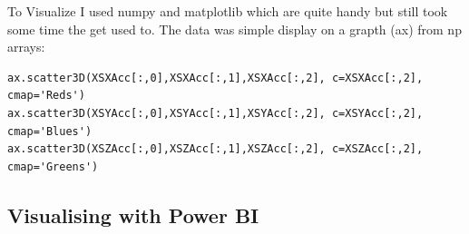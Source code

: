 To Visualize I used numpy and matplotlib which are quite handy but still took some time the get used to.
The data was simple display on a grapth (ax) from np arrays:

\begin{lstlisting}
ax.scatter3D(XSXAcc[:,0],XSXAcc[:,1],XSXAcc[:,2], c=XSXAcc[:,2], cmap='Reds')
ax.scatter3D(XSYAcc[:,0],XSYAcc[:,1],XSYAcc[:,2], c=XSYAcc[:,2], cmap='Blues')
ax.scatter3D(XSZAcc[:,0],XSZAcc[:,1],XSZAcc[:,2], c=XSZAcc[:,2], cmap='Greens')
\end{lstlisting}

\subsection{Visualising with Power BI}